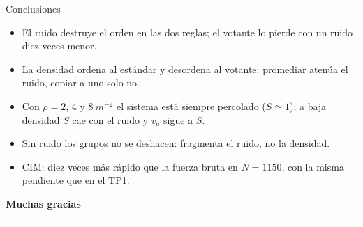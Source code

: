 \documentclass[aspectratio=169,11pt]{beamer}
\newcommand{\va}{\ensuremath{v_a}}
\begin{document}
\begin{frame}{Conclusiones}
    \begin{itemize}\setlength{\itemsep}{1.4em}
        \item El ruido destruye el orden en las dos reglas; el votante lo
              pierde con un ruido diez veces menor.
        \item La densidad ordena al estándar y desordena al votante:
              promediar atenúa el ruido, copiar a uno solo no.
        \item Con $\rho = 2$, $4$ y $\SI{8}{m^{-2}}$ el sistema está siempre
              percolado ($S \simeq 1$); a baja densidad $S$ cae con el ruido y
              $\va$ sigue a $S$.
        \item Sin ruido los grupos no se deshacen: fragmenta el ruido, no la
              densidad.
        \item CIM: diez veces más rápido que la fuerza bruta en $N = 1150$,
              con la misma pendiente que en el TP1.
    \end{itemize}
\end{frame}

\begin{frame}
    \vfill
    \begin{center}
        {\Large\bfseries\color{azul} Muchas gracias}\\[0.6em]
        \textcolor{azul!30}{\rule{0.25\textwidth}{1pt}}
    \end{center}
    \vfill
\end{frame}
\end{document}
